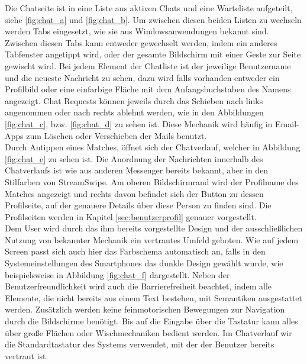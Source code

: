 Die Chatseite ist in eine Liste aus aktiven Chats und eine Warteliste aufgeteilt, siehe \ref{fig:chat_a} und \ref{fig:chat_b}. Um zwischen diesen beiden Listen zu wechseln werden Tabs eingesetzt, wie sie aus Windowsanwendungen bekannt sind. Zwischen diesen Tabs kann entweder gewechselt werden, indem ein anderes Tabfenster angetippt wird, oder der gesamte Bildschirm mit einer Geste zur Seite gewischt wird. Bei jedem Element der Chatliste ist der jeweilige Benutzername und die neueste Nachricht zu sehen, dazu wird falls vorhanden entweder ein Profilbild oder eine einfarbige Fläche mit dem Anfangsbuchstaben des Namens angezeigt. Chat Requests können jeweils durch das Schieben nach links angenommen oder nach rechts ablehnt werden, wie in den Abbildungen \ref{fig:chat_c}, bzw. \ref{fig:chat_d} zu sehen ist. Diese Mechanik wird häufig in Email-Apps zum Löschen oder Verschieben der Mails benutzt.\\ %
Durch Antippen eines Matches, öffnet sich der Chatverlauf, welcher in Abbildung \ref{fig:chat_e} zu sehen ist. Die Anordnung der Nachrichten innerhalb des Chatverlaufs ist wie aus anderen Messenger bereits bekannt, aber in den Stilfarben von StreamSwipe. Am oberen Bildschirmrand wird der Profilname des Matches angezeigt und rechts davon befindet sich der Button zu dessen Profilseite, auf der genauere Details über diese Person zu finden sind. Die Profilseiten werden in Kapitel \ref{sec:benutzerprofil} genauer vorgestellt. \\
Dem User wird durch das ihm bereits vorgestellte Design und der ausschließlichen Nutzung von bekannter Mechanik ein vertrautes Umfeld geboten. Wie auf jedem Screen passt sich auch hier das Farbschema automatisch an, falls in den Systemeinstellungen des Smartphones das dunkle Design gewählt wurde, wie beispielsweise in Abbildung \ref{fig:chat_f} dargestellt. Neben der Benutzerfreundlichkeit wird auch die Barrierefreiheit beachtet, indem alle Elemente, die nicht bereits aus einem Text bestehen, mit Semantiken ausgestattet werden. Zusätzlich werden keine feinmotorischen Bewegungen zur Navigation durch die Bildschirme benötigt. Bis auf die Eingabe über die Tastatur kann alles über große Flächen oder Wischmechaniken bedient werden. Im Chatverlauf wir die Standardtastatur des Systems verwendet, mit der der Benutzer bereits vertraut ist. 


